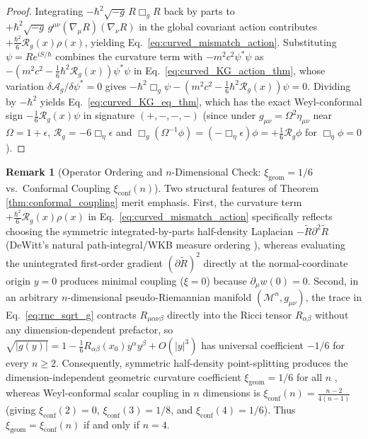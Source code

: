 \documentclass[11pt, a4paper]{article}
\theoremstyle{definition}
\newtheorem{remark}[theorem]{Remark}
\begin{document}
\begin{proof}
Integrating $-\hbar^2 \sqrt{-g}\,R\Box_g R$ back by parts to $+\hbar^2\sqrt{-g}\,g^{\mu\nu}(\nabla_\mu R)(\nabla_\nu R)$ in the global covariant action contributes $+\frac{\hbar^2}{6}\mathcal{R}_g(x)\rho(x)$, yielding Eq.~\eqref{eq:curved_mismatch_action}. Substituting $\psi = R e^{iS/\hbar}$ combines the curvature term with $-m^2 c^2 \psi^*\psi$ as $-\left(m^2 c^2 - \frac{1}{6}\hbar^2 \mathcal{R}_g(x)\right)\psi^*\psi$ in Eq.~\eqref{eq:curved_KG_action_thm}, whose variation $\delta\mathcal{A}_g / \delta\psi^* = 0$ gives $-\hbar^2 \Box_g \psi - \left(m^2 c^2 - \frac{1}{6}\hbar^2 \mathcal{R}_g(x)\right)\psi = 0$. Dividing by $-\hbar^2$ yields Eq.~\eqref{eq:curved_KG_eq_thm}, which has the exact Weyl-conformal sign $-\frac{1}{6}\mathcal{R}_g(x)\psi$ in signature $(+,-,-,-)$ (since under $g_{\mu\nu} = \Omega^2 \eta_{\mu\nu}$ near $\Omega = 1 + \epsilon$, $\mathcal{R}_g = -6\Box_\eta \epsilon$ and $\Box_g(\Omega^{-1}\phi) = (-\Box_\eta \epsilon)\phi = +\frac{1}{6}\mathcal{R}_g\phi$ for $\Box_\eta\phi = 0$).
\end{proof}

\begin{remark}[Operator Ordering and $n$-Dimensional Check: $\xi_{\text{geom}} = 1/6$ vs.\ Conformal Coupling $\xi_{\text{conf}}(n)$]
\label{rem:dimension_check_xi}
Two structural features of Theorem \ref{thm:conformal_coupling} merit emphasis. First, the curvature term $+\frac{\hbar^2}{6}\mathcal{R}_g(x)\rho(x)$ in Eq.~\eqref{eq:curved_mismatch_action} specifically reflects choosing the symmetric integrated-by-parts half-density Laplacian $-\tilde{R}\partial^2\tilde{R}$ (DeWitt's natural path-integral/WKB measure ordering \cite{DeWitt1957}), whereas evaluating the unintegrated first-order gradient $(\partial\tilde{R})^2$ directly at the normal-coordinate origin $y = 0$ produces minimal coupling ($\xi = 0$) because $\partial_\mu w(0) = 0$. Second, in an arbitrary $n$-dimensional pseudo-Riemannian manifold $(\mathcal{M}^n, g_{\mu\nu})$, the trace in Eq.~\eqref{eq:rnc_sqrt_g} contracts $R_{\mu\alpha\nu\beta}$ directly into the Ricci tensor $R_{\alpha\beta}$ without any dimension-dependent prefactor, so $\sqrt{|g(y)|} = 1 - \frac{1}{6}R_{\alpha\beta}(x_0)y^\alpha y^\beta + O(|y|^3)$ has universal coefficient $-1/6$ for every $n \ge 2$. Consequently, symmetric half-density point-splitting produces the dimension-independent geometric curvature coefficient $\xi_{\text{geom}} = 1/6$ for all $n$ \cite{DeWitt1957}, whereas Weyl-conformal scalar coupling in $n$ dimensions is $\xi_{\text{conf}}(n) = \frac{n - 2}{4(n - 1)}$ (giving $\xi_{\text{conf}}(2) = 0$, $\xi_{\text{conf}}(3) = 1/8$, and $\xi_{\text{conf}}(4) = 1/6$). Thus $\xi_{\text{geom}} = \xi_{\text{conf}}(n)$ if and only if $n = 4$.
\end{remark}
\end{document}
